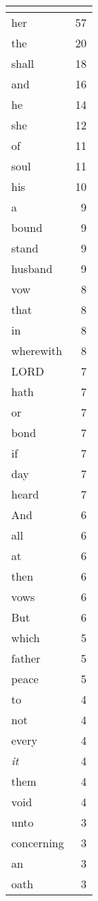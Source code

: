 \begin{center}
\begin{longtable}{l|r}
\hline \multicolumn{2}{c}{{ }} \\ \hline
\endfoot 
her & 57\\ \hline 
the & 20\\ \hline 
shall & 18\\ \hline 
and & 16\\ \hline 
he & 14\\ \hline 
she & 12\\ \hline 
of & 11\\ \hline 
soul & 11\\ \hline 
his & 10\\ \hline 
a & 9\\ \hline 
bound & 9\\ \hline 
stand & 9\\ \hline 
husband & 9\\ \hline 
vow & 8\\ \hline 
that & 8\\ \hline 
in & 8\\ \hline 
wherewith & 8\\ \hline 
LORD & 7\\ \hline 
hath & 7\\ \hline 
or & 7\\ \hline 
bond & 7\\ \hline 
if & 7\\ \hline 
day & 7\\ \hline 
heard & 7\\ \hline 
And & 6\\ \hline 
all & 6\\ \hline 
at & 6\\ \hline 
then & 6\\ \hline 
vows & 6\\ \hline 
But & 6\\ \hline 
which & 5\\ \hline 
father & 5\\ \hline 
peace & 5\\ \hline 
to & 4\\ \hline 
not & 4\\ \hline 
every & 4\\ \hline 
\emph{it} & 4\\ \hline 
them & 4\\ \hline 
void & 4\\ \hline 
unto & 3\\ \hline 
concerning & 3\\ \hline 
an & 3\\ \hline 
oath & 3\\ \hline 

\end{longtable}
\end{center}
